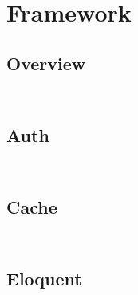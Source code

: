 \part{Framework}


\chapter{Overview}




\begin{lstlisting}[language=PHP]

\end{lstlisting}



\begin{lstlisting}[language=PHP]

\end{lstlisting}


\chapter{Auth}


\begin{lstlisting}[language=PHP]

\end{lstlisting}



\begin{lstlisting}[language=PHP]

\end{lstlisting}


\chapter{Cache}

\begin{lstlisting}[language=PHP]

\end{lstlisting}



\begin{lstlisting}[language=PHP]

\end{lstlisting}

\chapter{Eloquent}

\begin{lstlisting}[language=PHP]

\end{lstlisting}



